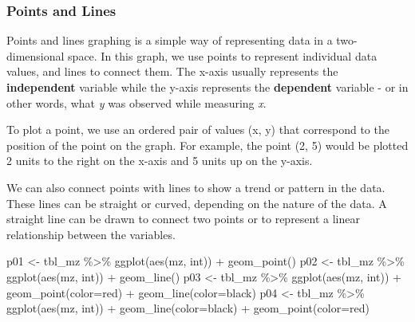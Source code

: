 \documentclass[
]{book}
\newenvironment{Shaded}{\begin{snugshade}}{\end{snugshade}}
\newcommand{\AttributeTok}[1]{\textcolor[rgb]{0.77,0.63,0.00}{#1}}
\newcommand{\FunctionTok}[1]{\textcolor[rgb]{0.00,0.00,0.00}{#1}}
\newcommand{\NormalTok}[1]{#1}
\newcommand{\OtherTok}[1]{\textcolor[rgb]{0.56,0.35,0.01}{#1}}
\newcommand{\SpecialCharTok}[1]{\textcolor[rgb]{0.00,0.00,0.00}{#1}}
\newcommand{\StringTok}[1]{\textcolor[rgb]{0.31,0.60,0.02}{#1}}
\begin{document}
\hypertarget{points-and-lines}{%
\subsubsection*{Points and Lines}\label{points-and-lines}}

Points and lines graphing is a simple way of representing data in a two-dimensional space. In this graph, we use points to represent individual data values, and lines to connect them. The x-axis usually represents the \textbf{independent} variable while the y-axis represents the \textbf{dependent} variable - or in other words, what \emph{y} was observed while measuring \emph{x}.

To plot a point, we use an ordered pair of values (x, y) that correspond to the position of the point on the graph. For example, the point (2, 5) would be plotted 2 units to the right on the x-axis and 5 units up on the y-axis.

We can also connect points with lines to show a trend or pattern in the data. These lines can be straight or curved, depending on the nature of the data. A straight line can be drawn to connect two points or to represent a linear relationship between the variables.

\begin{Shaded}
\begin{Highlighting}[]
\NormalTok{p01 }\OtherTok{\textless{}{-}}\NormalTok{ tbl\_mz }\SpecialCharTok{\%\textgreater{}\%} \FunctionTok{ggplot}\NormalTok{(}\FunctionTok{aes}\NormalTok{(mz, int)) }\SpecialCharTok{+} \FunctionTok{geom\_point}\NormalTok{()}
\NormalTok{p02 }\OtherTok{\textless{}{-}}\NormalTok{ tbl\_mz }\SpecialCharTok{\%\textgreater{}\%} \FunctionTok{ggplot}\NormalTok{(}\FunctionTok{aes}\NormalTok{(mz, int)) }\SpecialCharTok{+} \FunctionTok{geom\_line}\NormalTok{()}
\NormalTok{p03 }\OtherTok{\textless{}{-}}\NormalTok{ tbl\_mz }\SpecialCharTok{\%\textgreater{}\%} \FunctionTok{ggplot}\NormalTok{(}\FunctionTok{aes}\NormalTok{(mz, int)) }\SpecialCharTok{+} \FunctionTok{geom\_point}\NormalTok{(}\AttributeTok{color=}\StringTok{\textquotesingle{}red\textquotesingle{}}\NormalTok{) }\SpecialCharTok{+} \FunctionTok{geom\_line}\NormalTok{(}\AttributeTok{color=}\StringTok{\textquotesingle{}black\textquotesingle{}}\NormalTok{)}
\NormalTok{p04 }\OtherTok{\textless{}{-}}\NormalTok{ tbl\_mz }\SpecialCharTok{\%\textgreater{}\%} \FunctionTok{ggplot}\NormalTok{(}\FunctionTok{aes}\NormalTok{(mz, int)) }\SpecialCharTok{+} \FunctionTok{geom\_line}\NormalTok{(}\AttributeTok{color=}\StringTok{\textquotesingle{}black\textquotesingle{}}\NormalTok{) }\SpecialCharTok{+} \FunctionTok{geom\_point}\NormalTok{(}\AttributeTok{color=}\StringTok{\textquotesingle{}red\textquotesingle{}}\NormalTok{)}
\end{Highlighting}
\end{Shaded}
\end{document}
